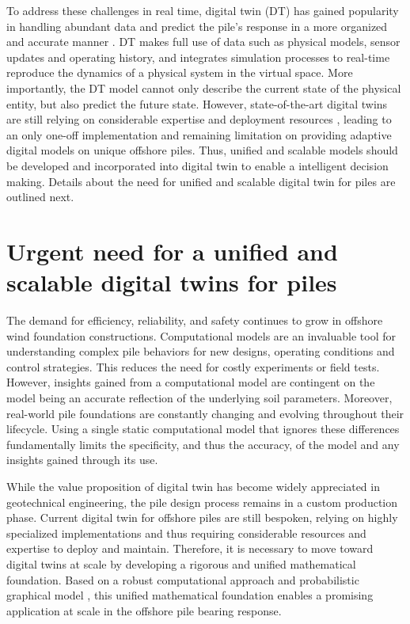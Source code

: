 To address these challenges in real time, digital twin (DT) has gained popularity in handling abundant data and predict the pile's response in a more organized and accurate manner \citep{wang2021}. DT makes full use of data such as physical models, sensor updates and operating history, and integrates simulation processes to real-time reproduce the dynamics of a physical system in the virtual space. More importantly, the DT model cannot only describe the current state of the physical entity, but also predict the future state. However, state-of-the-art digital twins are still relying on considerable expertise and deployment resources \citep{kapteyn2021}, leading to an only one-off implementation and remaining limitation on providing adaptive digital models on unique offshore piles. Thus, unified and scalable models should be developed and incorporated into digital twin to enable a intelligent decision making. Details about the need for unified and scalable digital twin for piles are outlined next.








\section{Urgent need for a unified and scalable digital twins for piles}
The demand for efficiency, reliability, and safety continues to grow in offshore wind foundation constructions. Computational models are an invaluable tool
 for understanding complex pile behaviors for new designs, operating conditions and control strategies. This reduces the need for costly experiments or field tests. However, insights gained from a computational model are contingent on the model being an accurate reflection of the underlying soil parameters. Moreover, real-world pile foundations are constantly changing and evolving throughout their lifecycle. Using a single static computational model that ignores these differences fundamentally limits the specificity,
 and thus the accuracy, of the model and any insights gained through its use.

 While the value proposition of digital twin has become widely appreciated in geotechnical engineering, the pile design process remains in a custom production phase. Current digital twin for offshore piles are still bespoken, relying on highly specialized implementations and thus requiring considerable resources and expertise to deploy and maintain. Therefore, it is necessary to move toward digital twins at scale by developing a rigorous and unified mathematical foundation. Based on a robust computational approach and  probabilistic graphical model \citep{kapteyn2021}, this unified mathematical foundation enables a promising application at scale in the offshore pile bearing response. 
 


